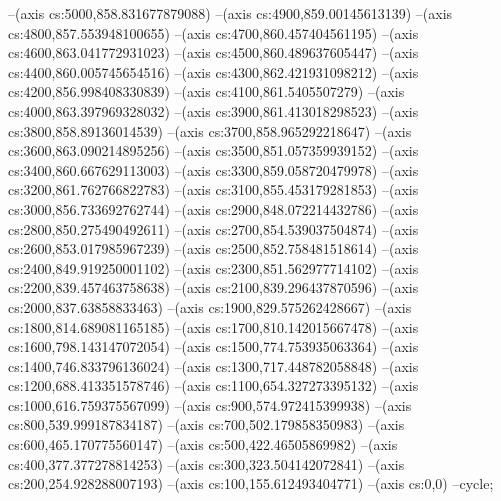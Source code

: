 --(axis cs:5000,858.831677879088)
--(axis cs:4900,859.00145613139)
--(axis cs:4800,857.553948100655)
--(axis cs:4700,860.457404561195)
--(axis cs:4600,863.041772931023)
--(axis cs:4500,860.489637605447)
--(axis cs:4400,860.005745654516)
--(axis cs:4300,862.421931098212)
--(axis cs:4200,856.998408330839)
--(axis cs:4100,861.5405507279)
--(axis cs:4000,863.397969328032)
--(axis cs:3900,861.413018298523)
--(axis cs:3800,858.89136014539)
--(axis cs:3700,858.965292218647)
--(axis cs:3600,863.090214895256)
--(axis cs:3500,851.057359939152)
--(axis cs:3400,860.667629113003)
--(axis cs:3300,859.058720479978)
--(axis cs:3200,861.762766822783)
--(axis cs:3100,855.453179281853)
--(axis cs:3000,856.733692762744)
--(axis cs:2900,848.072214432786)
--(axis cs:2800,850.275490492611)
--(axis cs:2700,854.539037504874)
--(axis cs:2600,853.017985967239)
--(axis cs:2500,852.758481518614)
--(axis cs:2400,849.919250001102)
--(axis cs:2300,851.562977714102)
--(axis cs:2200,839.457463758638)
--(axis cs:2100,839.296437870596)
--(axis cs:2000,837.63858833463)
--(axis cs:1900,829.575262428667)
--(axis cs:1800,814.689081165185)
--(axis cs:1700,810.142015667478)
--(axis cs:1600,798.143147072054)
--(axis cs:1500,774.753935063364)
--(axis cs:1400,746.833796136024)
--(axis cs:1300,717.448782058848)
--(axis cs:1200,688.413351578746)
--(axis cs:1100,654.327273395132)
--(axis cs:1000,616.759375567099)
--(axis cs:900,574.972415399938)
--(axis cs:800,539.999187834187)
--(axis cs:700,502.179858350983)
--(axis cs:600,465.170775560147)
--(axis cs:500,422.46505869982)
--(axis cs:400,377.377278814253)
--(axis cs:300,323.504142072841)
--(axis cs:200,254.928288007193)
--(axis cs:100,155.612493404771)
--(axis cs:0,0)
--cycle;

